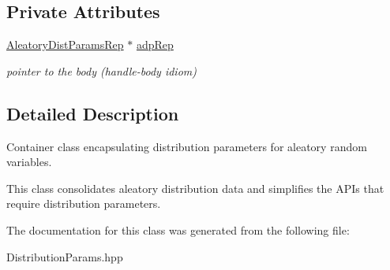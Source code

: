 \subsection*{Private Attributes}
\begin{DoxyCompactItemize}
\item 
\hyperlink{classPecos_1_1AleatoryDistParamsRep}{Aleatory\+Dist\+Params\+Rep} $\ast$ \hyperlink{classPecos_1_1AleatoryDistParams_ae0ee08dc258d04b54ce40c98c4bb61a3}{adp\+Rep}\label{classPecos_1_1AleatoryDistParams_ae0ee08dc258d04b54ce40c98c4bb61a3}

\begin{DoxyCompactList}\small\item\em pointer to the body (handle-\/body idiom) \end{DoxyCompactList}\end{DoxyCompactItemize}


\subsection{Detailed Description}
Container class encapsulating distribution parameters for aleatory random variables. 

This class consolidates aleatory distribution data and simplifies the A\+P\+Is that require distribution parameters. 

The documentation for this class was generated from the following file\+:\begin{DoxyCompactItemize}
\item 
Distribution\+Params.\+hpp\end{DoxyCompactItemize}
